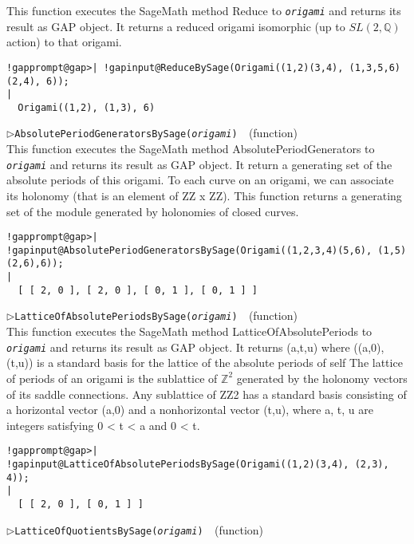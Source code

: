 \documentclass[a4paper,11pt]{report}
\begin{document}
{{{ This function executes the SageMath method Reduce to \mbox{\texttt{\mdseries\slshape origami}} and returns its result as \textsf{GAP} object. It returns a reduced origami isomorphic (up to $SL(2,\mathbb{Q})$ action) to that origami. 
\begin{Verbatim}[commandchars=!@|,fontsize=\small,frame=single,label=Example]
  !gapprompt@gap>| !gapinput@ReduceBySage(Origami((1,2)(3,4), (1,3,5,6)(2,4), 6));
|
  Origami((1,2), (1,3), 6)
\end{Verbatim}
 \noindent\textcolor{FuncColor}{$\triangleright$\enspace\texttt{AbsolutePeriodGeneratorsBySage({\mdseries\slshape origami})
\label{AbsolutePeriodGeneratorsBySage}
}\hfill{\scriptsize (function)}}\\


 This function executes the SageMath method AbsolutePeriodGenerators to \mbox{\texttt{\mdseries\slshape origami}} and returns its result as \textsf{GAP} object. It return a generating set of the absolute periods of this origami. To
each curve on an origami, we can associate its holonomy (that is an element of
ZZ x ZZ). This function returns a generating set of the module generated by
holonomies of closed curves. 
\begin{Verbatim}[commandchars=!@|,fontsize=\small,frame=single,label=Example]
  !gapprompt@gap>| !gapinput@AbsolutePeriodGeneratorsBySage(Origami((1,2,3,4)(5,6), (1,5)(2,6),6)); 
|
  [ [ 2, 0 ], [ 2, 0 ], [ 0, 1 ], [ 0, 1 ] ]
\end{Verbatim}
 \noindent\textcolor{FuncColor}{$\triangleright$\enspace\texttt{LatticeOfAbsolutePeriodsBySage({\mdseries\slshape origami})
\label{LatticeOfAbsolutePeriodsBySage}
}\hfill{\scriptsize (function)}}\\


 This function executes the SageMath method LatticeOfAbsolutePeriods to \mbox{\texttt{\mdseries\slshape origami}} and returns its result as \textsf{GAP} object. It returns (a,t,u) where ((a,0),(t,u)) is a standard basis for the
lattice of the absolute periods of self The lattice of periods of an origami
is the sublattice of $ \mathbb{Z}^2$ generated by the holonomy vectors of its saddle connections. Any sublattice of
ZZ\texttt{}2 has a standard basis consisting of a horizontal vector
(a,0) and a nonhorizontal vector (t,u), where a, t, u are integers satisfying
0 {\textless} t {\textless} a and 0 {\textless} t. 
\begin{Verbatim}[commandchars=!@|,fontsize=\small,frame=single,label=Example]
  !gapprompt@gap>| !gapinput@LatticeOfAbsolutePeriodsBySage(Origami((1,2)(3,4), (2,3), 4));   
|
  [ [ 2, 0 ], [ 0, 1 ] ]
\end{Verbatim}
 \noindent\textcolor{FuncColor}{$\triangleright$\enspace\texttt{LatticeOfQuotientsBySage({\mdseries\slshape origami})
\label{LatticeOfQuotientsBySage}
}\hfill{\scriptsize (function)}}\\


}}}
\end{document}
